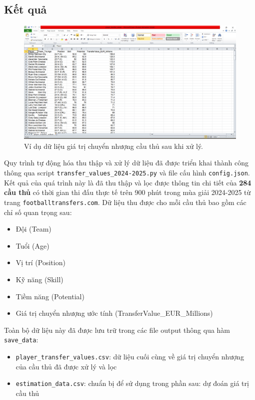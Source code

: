 \documentclass[12pt, a4paper]{report}
\begin{document}
\subsection{Kết quả}

\begin{figure}[H]
    \centering
    \includegraphics[width=\textwidth]{player_values.png}
    \caption{Ví dụ dữ liệu giá trị chuyển nhượng cầu thủ sau khi xử lý.}
    \label{fig:player_transfer_values}
\end{figure}

Quy trình tự động hóa thu thập và xử lý dữ liệu đã được triển khai thành công thông qua script \texttt{transfer\_values\_2024-2025.py} và file cấu hình \texttt{config.json}.
Kết quả của quá trình này là đã thu thập và lọc được thông tin chi tiết của \textbf{284 cầu thủ} có thời gian thi đấu thực tế trên 900 phút trong mùa giải 2024-2025 từ trang \texttt{footballtransfers.com}.
Dữ liệu thu được cho mỗi cầu thủ bao gồm các chỉ số quan trọng sau:
\begin{itemize}
    \item Đội (Team)
    \item Tuổi (Age)
    \item Vị trí (Position)
    \item Kỹ năng (Skill)
    \item Tiềm năng (Potential)
    \item Giá trị chuyển nhượng ước tính (TransferValue\_EUR\_Millions)
\end{itemize}
Toàn bộ dữ liệu này đã được lưu trữ trong các file output thông qua hàm \texttt{save\_data}:
\begin{itemize}
    \item \texttt{player\_transfer\_values.csv}: dữ liệu cuối cùng về giá trị chuyển nhượng của cầu thủ đã được xử lý và lọc
    \item \texttt{estimation\_data.csv}: chuẩn bị để sử dụng trong phần sau: dự đoán giá trị cầu thủ
\end{itemize}
\end{document}
